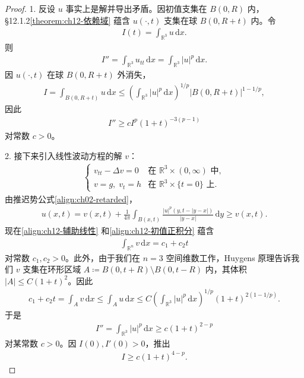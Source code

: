 \documentclass[../../main.tex]{subfiles}
\begin{document}
\begin{proof}
1. 反设 $u$ 事实上是解并导出矛盾。因初值支集在 $B(0,R)$ 内，\S12.1.2\cref{theorem:ch12-依赖域} 蕴含 $u(\cdot,t)$ 支集在球 $B(0,R+t)$ 内。令
\begin{align*}
I(t)=\int_{\mathbb{R}^3}u\,\mathrm{d}x.
\end{align*}
则
\begin{align*}
I''=\int_{\mathbb{R}^3}u_{tt}\,\mathrm{d}x=\int_{\mathbb{R}^3}|u|^p\,\mathrm{d}x.
\end{align*}
因 $u(\cdot,t)$ 在球 $B(0,R+t)$ 外消失，
\begin{align*}
I=\int_{B(0,R+t)}u\,\mathrm{d}x\leqslant\left(\int_{\mathbb{R}^3}|u|^p\,\mathrm{d}x\right)^{1/p}|B(0,R+t)|^{1-1/p},
\end{align*}
因此
\begin{align}
I''\geqslant cI^p(1+t)^{-3(p-1)}
\label{align:ch12-Ip}
\end{align}
对常数 $c>0$。

2. 接下来引入线性波动方程的解 $v$：
\begin{align}
\begin{cases}
v_{tt}-\Delta v=0 & \text{在 } \mathbb{R}^3\times(0,\infty) \text{ 中},\\
v=g,\;v_t=h & \text{在 } \mathbb{R}^3\times\{t=0\} \text{ 上}.
\end{cases}
\label{align:ch12-辅助线性}
\end{align}
由推迟势公式\eqref{align:ch02-retarded}，
\begin{align*}
u(x,t)=v(x,t)+\frac{1}{4\pi}\int_{B(x,t)}\frac{|u|^p(y,t-|y-x|)}{|y-x|}\,\mathrm{d}y\geqslant v(x,t).
\end{align*}
现在\eqref{align:ch12-辅助线性} 和\eqref{align:ch12-初值正积分} 蕴含
\begin{align*}
\int_{\mathbb{R}^n}v\,\mathrm{d}x=c_1+c_2t
\end{align*}
对常数 $c_1,c_2>0$。此外，由于我们在 $n=3$ 空间维数工作，Huygens 原理告诉我们 $v$ 支集在环形区域 $A\coloneqq B(0,t+R)\setminus B(0,t-R)$ 内，其体积 $|A|\leqslant C(1+t)^2$。因此
\begin{align*}
c_1+c_2t=\int_A v\,\mathrm{d}x\leqslant\int_A u\,\mathrm{d}x\leqslant C\left(\int_{\mathbb{R}^3}|u|^p\,\mathrm{d}x\right)^{1/p}(1+t)^{2(1-1/p)}.
\end{align*}
于是
\begin{align*}
I''=\int_{\mathbb{R}^3}|u|^p\,\mathrm{d}x\geqslant c(1+t)^{2-p}
\end{align*}
对某常数 $c>0$。因 $I(0),I'(0)>0$，推出
\begin{align}
I\geqslant c(1+t)^{4-p}.
\label{align:ch12-I下界}
\end{align}


\end{proof}
\end{document}
